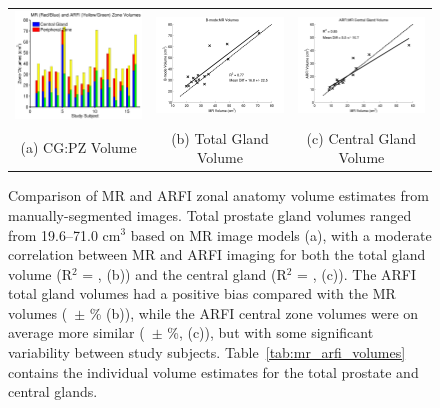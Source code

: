 \begin{figure}[htb!]
\centering
\begin{tabular}{ccc}
\includegraphics[width=0.3\linewidth]{figs/mr_arfi_volumes} &
\includegraphics[width=0.3\linewidth]{figs/mr_arfi_total_linreg} &
\includegraphics[width=0.3\linewidth]{figs/mr_arfi_central_linreg} \\
(a) CG:PZ Volume & (b) Total Gland Volume & (c) Central Gland Volume \\
\end{tabular}
\caption{Comparison of MR and ARFI zonal anatomy volume estimates from
    manually-segmented images.  Total prostate gland volumes ranged from
    19.6--71.0 cm$^3$ based on MR image models (a), with a moderate correlation
    between MR and ARFI imaging for both the total gland volume (R$^2$ =
    \MRarfiVolTotalRsq, (b)) and the central gland (R$^2$ =
    \MRarfiVolCentralRsq, (c)).  The ARFI total gland volumes had a positive
    bias compared with the MR volumes (\MRarfiVolTotalMeanDiff~$\pm$
    \MRarfiVolTotalStdDiff\% (b)), while the ARFI central zone volumes were on
    average more similar (\MRarfiVolCentralMeanDiff~$\pm$
    \MRarfiVolCentralStdDiff\%, (c)), but with some significant variability
    between study subjects.  Table~\ref{tab:mr_arfi_volumes} contains the
    individual volume estimates for the total prostate and central glands.}
\label{fig:mr_arfi_volumes} 
\end{figure}
